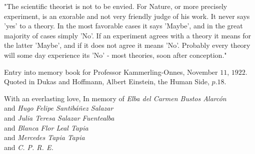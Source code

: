   "The scientific theorist is not to be envied. For Nature, or more precisely experiment, is an exorable and not very friendly judge of his work. It never says 'yes' to a theory. In the most favorable cases it says 'Maybe', and in the great majority of cases simply 'No'. If an experiment agrees with a theory it means for the latter 'Maybe', and if it does not agree it means 'No'. Probably every theory will some day experience its 'No' - most theories, soon after conception."


\vspace{1.0cm}
\begin{flushright}
Entry into memory book for Professor Kammerling-Onnes, November $11$, $1922$.\\
Quoted in Dukas and Hoffmann, Albert Einstein, the Human Side, $p.18$.
\end{flushright}

\vspace{13.0cm}
\begin{flushright}
	With an everlasting love, In memory of \emph{Elba del Carmen Bustos Alarcón} \\
	and \emph{Hugo Felipe Santibáñez Salazar}  \\
	and \emph{Julia Teresa Salazar Fuentealba} \\
	and \emph{Blanca Flor Leal Tapia} \\
	and \emph{Mercedes Tapia Tapia} \\
	and \emph{C. P. R. E.}
\end{flushright}
